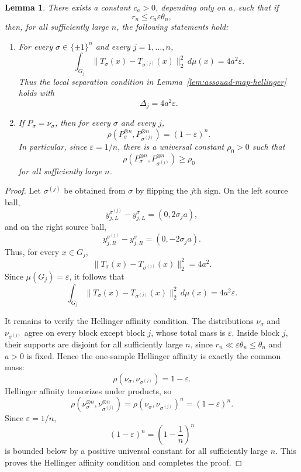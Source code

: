 \documentclass[11pt,twoside]{article}
\newtheorem{lemma}{Lemma}
\begin{document}
\begin{lemma}
\label{lem:lower-bound-analysis}
There exists a constant $c_a>0$, depending only on $a$,
such that if
\[
r_n \leq c_a \varepsilon \theta_n,
\]
then, for all sufficiently large $n$, the following statements hold:
\begin{enumerate}

\item For every $\sigma\in\{\pm1\}^n$ and every $j=1,\ldots,n$,
\[
\int_{G_j}
\|T_\sigma(x)-T_{\sigma^{(j)}}(x)\|_2^2\,d\mu(x)
=
4a^2\varepsilon.
\]
Thus the local separation condition in Lemma~\ref{lem:assouad-map-hellinger}
holds with
\[
\Delta_j=4a^2\varepsilon.
\]

\item If $P_\sigma=\nu_\sigma$, then for every $\sigma$ and every $j$,
\[
\rho(P_\sigma^{\otimes n},P_{\sigma^{(j)}}^{\otimes n})
=
(1-\varepsilon)^n.
\]
In particular, since $\varepsilon=1/n$, there is a universal constant
$\rho_0>0$ such that
\[
\rho(P_\sigma^{\otimes n},P_{\sigma^{(j)}}^{\otimes n})
\geq \rho_0
\]
for all sufficiently large $n$.
\end{enumerate}
\end{lemma}
\begin{proof}
Let $\sigma^{(j)}$ be
obtained from $\sigma$ by flipping the $j$th sign. On the left source ball,
\[
y_{j,L}^{\sigma^{(j)}}-y_{j,L}^{\sigma}
=
(0,2\sigma_j a),
\]
and on the right source ball,
\[
y_{j,R}^{\sigma^{(j)}}-y_{j,R}^{\sigma}
=
(0,-2\sigma_j a).
\]
Thus, for every $x\in G_j$,
\[
\|T_\sigma(x)-T_{\sigma^{(j)}}(x)\|_2^2=4a^2.
\]
Since $\mu(G_j)=\varepsilon$, it follows that
\[
\int_{G_j}
\|T_\sigma(x)-T_{\sigma^{(j)}}(x)\|_2^2\,d\mu(x)
=
4a^2\varepsilon.
\]

It remains to verify the Hellinger affinity condition. The distributions
$\nu_\sigma$ and $\nu_{\sigma^{(j)}}$ agree on every block except block
$j$, whose total mass is $\varepsilon$. Inside block $j$, their supports
are disjoint for all sufficiently large $n$, since
$r_n\ll \varepsilon\theta_n\leq \theta_n$ and $a>0$ is fixed. Hence the
one-sample Hellinger affinity is exactly the common mass:
\[
\rho(\nu_\sigma,\nu_{\sigma^{(j)}})
=
1-\varepsilon.
\]
Hellinger affinity tensorizes under products, so
\[
\rho(\nu_\sigma^{\otimes n},\nu_{\sigma^{(j)}}^{\otimes n})
=
\rho(\nu_\sigma,\nu_{\sigma^{(j)}})^n
=
(1-\varepsilon)^n.
\]
Since $\varepsilon=1/n$,
\[
(1-\varepsilon)^n
=
\left(1-\frac1n\right)^n
\]
is bounded below by a positive universal constant for all sufficiently
large $n$. This proves the Hellinger affinity condition and completes the
proof.
\end{proof}
\end{document}
